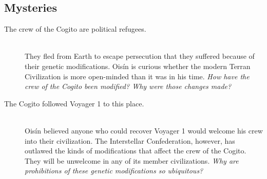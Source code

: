 \documentclass[11pt, a5paper, parskip=half-, DIV=12]{scrartcl}
\begin{document}
\subsection*{Mysteries}
\begin{description}
	\item[The crew of the Cogito are political refugees.] \phantom{a} \\ They fled from Earth to escape persecution that they suffered because of their genetic modifications.
Ois\'in is curious whether the modern Terran Civilization is more open-minded than it was in his time. \textit{How have the crew of the Cogito been modified?  Why were those changes made?}
	\item[The Cogito followed Voyager 1 to this place.] \phantom{a} \\ Ois\'in believed anyone who could recover Voyager 1 would welcome his crew into their civilization. The Interstellar Confederation, however, has outlawed the kinds of modifications that affect the crew of the Cogito. They will be unwelcome in any of its member civilizations.
\textit{Why are prohibitions of these genetic modifications so ubiquitous?}
\end{description}

\newpage



\newpage

\thispagestyle{empty}
\end{document}
